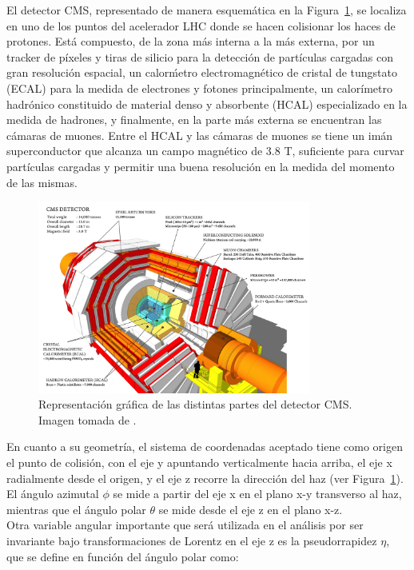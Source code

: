 
El detector CMS, representado de manera esquem\'atica en la Figura~\ref{fig:CMS}, se localiza en uno de los puntos del acelerador LHC donde se hacen colisionar los haces de protones. Est\'a compuesto, de la zona m\'as interna a la m\'as externa, por un tracker de p\'ixeles y tiras de silicio para la detecci\'on de partículas cargadas con gran resoluci\'on espacial, un calor\'metro electromagn\'etico de cristal de tungstato (ECAL) para la medida de electrones y fotones principalmente, un calor\'imetro hadr\'onico constituido de material denso y absorbente (HCAL) especializado en la medida de hadrones, y finalmente, en la parte m\'as externa se encuentran las c\'amaras de muones. Entre el HCAL y las c\'amaras de muones se tiene un im\'an superconductor que alcanza un campo magn\'etico de 3.8 T, suficiente para curvar part\'iculas cargadas y permitir una buena resoluci\'on en la medida del momento de las mismas.

\begin{figure}[h]
\centering
\includegraphics[width=0.80\textwidth]{figures/cms_160312_02.png}
\caption{Representaci\'on gr\'afica de las distintas partes del detector CMS. Imagen tomada de \cite{Sakuma:2665537}.}
\label{fig:CMS}        
\end{figure}

En cuanto a su geometr\'ia, el sistema de coordenadas aceptado tiene como origen el punto de colisi\'on, con el eje y apuntando verticalmente hacia arriba, el eje x radialmente desde el origen, y el eje z recorre la direcci\'on del haz (ver Figura~\ref{fig:CMS}). El \'angulo azimutal $\phi$ se mide a partir del eje x en el plano x-y transverso al haz, mientras que el \'angulo polar $\theta$ se mide desde el eje z en el plano x-z. \\
Otra variable angular importante que ser\'a utilizada en el an\'alisis por ser invariante bajo transformaciones de Lorentz en el eje z es la pseudorrapidez $\eta$, que se define en funci\'on del \'angulo polar como: \\

